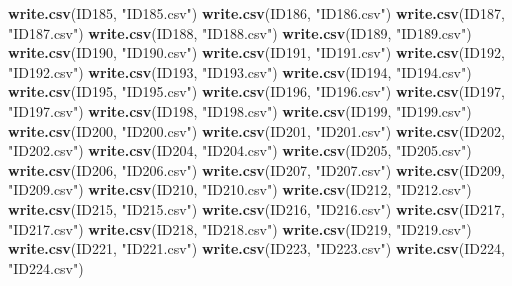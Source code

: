 \documentclass[
]{book}
\newenvironment{Shaded}{\begin{snugshade}}{\end{snugshade}}
\newcommand{\KeywordTok}[1]{\textcolor[rgb]{0.13,0.29,0.53}{\textbf{#1}}}
\newcommand{\NormalTok}[1]{#1}
\newcommand{\StringTok}[1]{\textcolor[rgb]{0.31,0.60,0.02}{#1}}
\begin{document}
\begin{Shaded}
\begin{Highlighting}[]
{{{{{{\KeywordTok{write.csv}\NormalTok{(ID185, }\StringTok{"ID185.csv"}\NormalTok{)}
\KeywordTok{write.csv}\NormalTok{(ID186, }\StringTok{"ID186.csv"}\NormalTok{)}
\KeywordTok{write.csv}\NormalTok{(ID187, }\StringTok{"ID187.csv"}\NormalTok{)}
\KeywordTok{write.csv}\NormalTok{(ID188, }\StringTok{"ID188.csv"}\NormalTok{)}
\KeywordTok{write.csv}\NormalTok{(ID189, }\StringTok{"ID189.csv"}\NormalTok{)}
\KeywordTok{write.csv}\NormalTok{(ID190, }\StringTok{"ID190.csv"}\NormalTok{)}
\KeywordTok{write.csv}\NormalTok{(ID191, }\StringTok{"ID191.csv"}\NormalTok{)}
\KeywordTok{write.csv}\NormalTok{(ID192, }\StringTok{"ID192.csv"}\NormalTok{)}
\KeywordTok{write.csv}\NormalTok{(ID193, }\StringTok{"ID193.csv"}\NormalTok{)}
\KeywordTok{write.csv}\NormalTok{(ID194, }\StringTok{"ID194.csv"}\NormalTok{)}
\KeywordTok{write.csv}\NormalTok{(ID195, }\StringTok{"ID195.csv"}\NormalTok{)}
\KeywordTok{write.csv}\NormalTok{(ID196, }\StringTok{"ID196.csv"}\NormalTok{)}
\KeywordTok{write.csv}\NormalTok{(ID197, }\StringTok{"ID197.csv"}\NormalTok{)}
\KeywordTok{write.csv}\NormalTok{(ID198, }\StringTok{"ID198.csv"}\NormalTok{)}
\KeywordTok{write.csv}\NormalTok{(ID199, }\StringTok{"ID199.csv"}\NormalTok{)}
\KeywordTok{write.csv}\NormalTok{(ID200, }\StringTok{"ID200.csv"}\NormalTok{)}
\KeywordTok{write.csv}\NormalTok{(ID201, }\StringTok{"ID201.csv"}\NormalTok{)}
\KeywordTok{write.csv}\NormalTok{(ID202, }\StringTok{"ID202.csv"}\NormalTok{)}
\KeywordTok{write.csv}\NormalTok{(ID204, }\StringTok{"ID204.csv"}\NormalTok{)}
\KeywordTok{write.csv}\NormalTok{(ID205, }\StringTok{"ID205.csv"}\NormalTok{)}
\KeywordTok{write.csv}\NormalTok{(ID206, }\StringTok{"ID206.csv"}\NormalTok{)}
\KeywordTok{write.csv}\NormalTok{(ID207, }\StringTok{"ID207.csv"}\NormalTok{)}
\KeywordTok{write.csv}\NormalTok{(ID209, }\StringTok{"ID209.csv"}\NormalTok{)}
\KeywordTok{write.csv}\NormalTok{(ID210, }\StringTok{"ID210.csv"}\NormalTok{)}
\KeywordTok{write.csv}\NormalTok{(ID212, }\StringTok{"ID212.csv"}\NormalTok{)}
\KeywordTok{write.csv}\NormalTok{(ID215, }\StringTok{"ID215.csv"}\NormalTok{)}
\KeywordTok{write.csv}\NormalTok{(ID216, }\StringTok{"ID216.csv"}\NormalTok{)}
\KeywordTok{write.csv}\NormalTok{(ID217, }\StringTok{"ID217.csv"}\NormalTok{)}
\KeywordTok{write.csv}\NormalTok{(ID218, }\StringTok{"ID218.csv"}\NormalTok{)}
\KeywordTok{write.csv}\NormalTok{(ID219, }\StringTok{"ID219.csv"}\NormalTok{)}
\KeywordTok{write.csv}\NormalTok{(ID221, }\StringTok{"ID221.csv"}\NormalTok{)}
\KeywordTok{write.csv}\NormalTok{(ID223, }\StringTok{"ID223.csv"}\NormalTok{)}
\KeywordTok{write.csv}\NormalTok{(ID224, }\StringTok{"ID224.csv"}\NormalTok{)}
}}}}}}
\end{Highlighting}
\end{Shaded}
\end{document}
